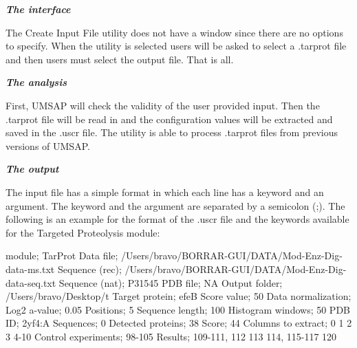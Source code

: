 \textit{\textbf{The interface}}

The Create Input File utility does not have a window since there are no options to specify. When the utility is selected users will be asked to select a .tarprot file and then users must select the output file. That is all.

\textit{\textbf{The analysis}}

First, UMSAP will check the validity of the user provided input. Then the .tarprot file will be read in and the configuration values will be extracted and saved in the .uscr file. The utility is able to process .tarprot files from previous versions of UMSAP.

\textit{\textbf{The output}}

The input file has a simple format in which each line has a keyword and an argument. The keyword and the argument are separated by a semicolon (;). The following is an example for the format of the .uscr file and the keywords available for the Targeted Proteolysis module:

module; TarProt\newline
Data file; /Users/bravo/BORRAR-GUI/DATA/Mod-Enz-Dig-data-ms.txt\newline
Sequence (rec); /Users/bravo/BORRAR-GUI/DATA/Mod-Enz-Dig-data-seq.txt\newline
Sequence (nat); P31545\newline
PDB file; NA\newline
Output folder; /Users/bravo/Desktop/t\newline
Target protein; efeB\newline
Score value; 50\newline
Data normalization; Log2\newline
a-value; 0.05\newline
Positions; 5\newline
Sequence length; 100\newline
Histogram windows; 50\newline
PDB ID; 2yf4:A\newline
Sequences; 0\newline
Detected proteins; 38\newline
Score; 44\newline
Columns to extract; 0 1 2 3 4-10\newline
Control experiments; 98-105\newline
Results; 109-111, 112 113 114, 115-117 120\newline

